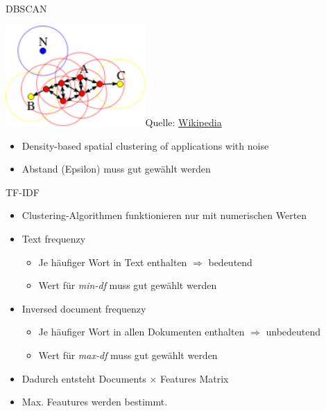 \documentclass[compress,t]{beamer}
\begin{document}
\begin{frame}{DBSCAN}

    \begin{center}
        \includegraphics[width=0.4\textwidth]{img/dbscan.png}{Quelle: \href{http://www.oracle.com/technetwork/java/javase/tech/memorymanagement-whitepaper-1-150020.pdf}{Wikipedia}}
    \end{center}

    \begin{itemize}
        \item Density-based spatial clustering of applications with noise
        \item Abstand (Epsilon) muss gut gewählt werden
    \end{itemize}

\end{frame}

\begin{frame}{TF-IDF}

    \begin{itemize}
        \item Clustering-Algorithmen funktionieren nur mit numerischen Werten
        \item Text frequenzy
            \begin{itemize}
                \item Je häufiger Wort in Text enthalten \(\Rightarrow\) bedeutend
                \item Wert für \emph{min-df} muss gut gewählt werden
            \end{itemize}
        \item Inversed document frequenzy
            \begin{itemize}
                \item Je häufiger Wort in allen Dokumenten enthalten \(\Rightarrow\) unbedeutend
                \item Wert für \emph{max-df} muss gut gewählt werden
            \end{itemize}
        \item Dadurch entsteht Documents \(\times\) Features Matrix
        \item Max. Feautures werden bestimmt.
    \end{itemize}

\end{frame}
\end{document}
